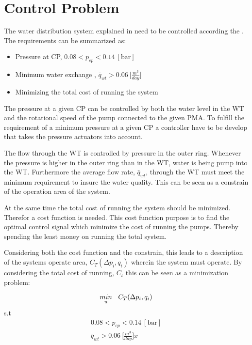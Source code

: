 \section{Control Problem}
\label{control_problem}

The water distribution system explained in  need to be controlled according the . The requirements can be summarized as: 

\begin{itemize}
	\item Pressure at CP, $0.08 < p_{cp} < 0.14 \:[\text{bar}]$
%
	\item Minimum water exchange , $\bar{q}_{wt} > 0.06 \: \big[\frac{m^3}{day}\big]$
%
	\item Minimizing the total cost of running the system
\end{itemize}

The pressure at a given CP can be controlled by both the water level in the WT and the rotational speed of the pump connected to the given PMA. To fulfill the requirement of a minimum pressure at a given CP a controller have to be develop that takes the pressure actuators into account. 

The flow through the WT is controlled by pressure in the outer ring. Whenever the pressure is higher in the outer ring than in the WT, water is being pump into the WT. Furthermore the average flow rate, $\bar{q}_{wt}$, through the WT must meet the minimum requirement to insure the water quality. This can be seen as a constrain of the operation area of the system. 

At the same time the total cost of running the system should be minimized. Therefor a cost function is needed. This cost function purpose is to find the optimal control signal which minimize the cost of running the pumps. Thereby spending the least money on running the total system. 

Considering both the cost function and the constrain, this leads to a description of the systems operate area, $C_T(\Delta{p}_i,q_i)$ wherein the system must operate. By considering the total cost of running, $C_t$ this can be seen as a minimization problem:

\begin{equation}
\underset{u}{min} \: \: \: \: C_T(\Delta{p}_i,q_i) \\
\end{equation}
\vspace*{-0.4mm}
s.t 
\vspace*{-0.4mm}
\begin{align*}
0.08 < p_{cp} < 0.14 \:[\text{bar}]\\
\bar{q}_{wt} > 0.06 \: \big[\frac{m^3}{day}\big] x 
\end{align*}

